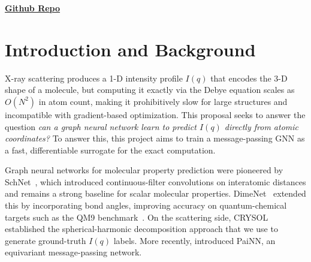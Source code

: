 \documentclass[final]{article}
\begin{document}
\vspace{-20pt}

\href{https://github.com/noshou/APS360/tree/main}{\textbf{Github Repo}}



\section{Introduction and Background}

X-ray scattering produces a 1-D intensity profile $I(q)$ that encodes the 3-D shape of a
molecule, but computing it exactly via the Debye equation scales as $O(N^2)$ in atom count,
making it prohibitively slow for large structures and incompatible with gradient-based
optimization. This proposal seeks to answer the question 
\emph{can a graph neural network learn to predict $I(q)$ directly from
atomic coordinates?} To answer this, this project aims to train a message-passing GNN as a fast, 
differentiable surrogate for the exact computation. 

Graph neural networks for molecular property prediction were pioneered by
SchNet~\cite{schutt_schnet_2018}, which introduced continuous-filter convolutions on
interatomic distances and remains a strong baseline for scalar molecular properties.
DimeNet~\cite{gasteiger_dimenet_2020} extended this by incorporating bond angles, improving
accuracy on quantum-chemical targets such as the QM9 benchmark~\cite{ramakrishnan_qm9_2014}.
On the scattering side, CRYSOL~\cite{svergun_crysol_1995} established the spherical-harmonic
decomposition approach that we use to generate ground-truth $I(q)$ labels.
More recently, \citet{Schutt2021} introduced PaiNN, an equivariant message-passing network.
\end{document}
